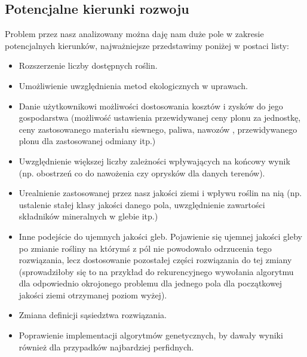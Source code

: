 \documentclass{article}
\begin{document}
\subsection{Potencjalne kierunki rozwoju}
Problem przez nasz analizowany można daję nam duże pole w zakresie potencjalnych kierunków, najważniejsze przedstawimy poniżej w postaci listy:
\begin{itemize}
		\item Rozszerzenie liczby dostępnych roślin.

		\item Umożliwienie uwzględnienia metod ekologicznych w uprawach.

		\item Danie użytkownikowi możliwości dostosowania kosztów i zysków do jego gospodarstwa (możliwość ustawienia przewidywanej ceny plonu za jednostkę, ceny zastosowanego materiału siewnego, paliwa, nawozów , przewidywanego plonu dla zastosowanej odmiany itp.)

		\item Uwzględnienie większej liczby zależności wpływających na końcowy wynik (np. obostrzeń co do nawożenia czy oprysków dla danych terenów).

		\item Urealnienie zastosowanej przez nasz jakości ziemi i wpływu roślin na nią (np. ustalenie stałej klasy jakości danego pola, uwzględnienie zawartości składników mineralnych w glebie itp.)

		\item Inne podejście do ujemnych jakości gleb. Pojawienie się ujemnej jakości gleby po zmianie rośliny na którymś z pól nie powodowało odrzucenia tego rozwiązania, lecz dostosowanie pozostałej części rozwiązania do tej zmiany (sprowadziłoby się to na przykład do rekurencyjnego wywołania algorytmu dla odpowiednio okrojonego problemu dla jednego pola dla początkowej jakości ziemi otrzymanej poziom wyżej).

		\item Zmiana definicji sąsiedztwa rozwiązania.

		\item Poprawienie implementacji algorytmów genetycznych, by dawały wyniki również dla przypadków najbardziej perfidnych.


\end{itemize}
\end{document}
